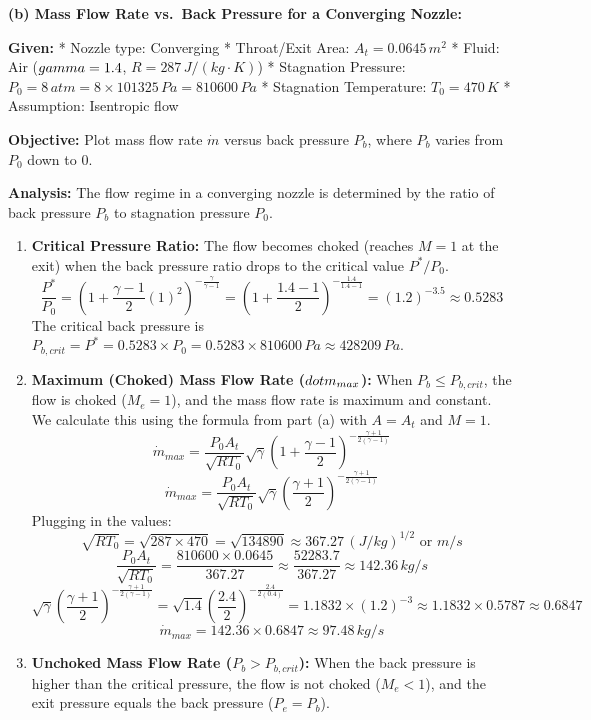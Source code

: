 \textbf{(b) Mass Flow Rate vs.~Back Pressure for a Converging Nozzle:}

\textbf{Given:} * Nozzle type: Converging * Throat/Exit Area:
\(A_t = 0.0645 \, m^2\) * Fluid: Air (\(\\gamma = 1.4\),
\(R = 287 \, J/(kg \cdot K)\)) * Stagnation Pressure:
\(P_0 = 8 \, atm = 8 \times 101325 \, Pa = 810600 \, Pa\) * Stagnation
Temperature: \(T_0 = 470 \, K\) * Assumption: Isentropic flow

\textbf{Objective:} Plot mass flow rate \(\dot{m}\) versus back pressure
\(P_b\), where \(P_b\) varies from \(P_0\) down to 0.

\textbf{Analysis:} The flow regime in a converging nozzle is determined
by the ratio of back pressure \(P_b\) to stagnation pressure \(P_0\).

\begin{enumerate}
\def\labelenumi{\arabic{enumi}.}
\item
  \textbf{Critical Pressure Ratio:} The flow becomes choked (reaches
  \(M=1\) at the exit) when the back pressure ratio drops to the
  critical value \(P^*/P_0\).
  \[ \frac{P^*}{P_0} = \left( 1 + \frac{\gamma-1}{2} (1)^2 \right)^{-\frac{\gamma}{\gamma-1}} = \left( 1 + \frac{1.4-1}{2} \right)^{-\frac{1.4}{1.4-1}} = (1.2)^{-3.5} \approx 0.5283 \]
  The critical back pressure is
  \(P_{b, crit} = P^* = 0.5283 \times P_0 = 0.5283 \times 810600 \, Pa \approx 428209 \, Pa\).
\item
  \textbf{Maximum (Choked) Mass Flow Rate (\(\\dot{m}_{max}\)):} When
  \(P_b \le P_{b, crit}\), the flow is choked (\(M_e = 1\)), and the
  mass flow rate is maximum and constant. We calculate this using the
  formula from part (a) with \(A=A_t\) and \(M=1\).
  \[ \dot{m}_{max} = \frac{P_0 A_t}{\sqrt{R T_0}} \sqrt{\gamma} \left( 1 + \frac{\gamma-1}{2} \right)^{-\frac{\gamma+1}{2(\gamma-1)}} \]
  \[ \dot{m}_{max} = \frac{P_0 A_t}{\sqrt{R T_0}} \sqrt{\gamma} \left( \frac{\gamma+1}{2} \right)^{-\frac{\gamma+1}{2(\gamma-1)}} \]
  Plugging in the values:
  \[ \sqrt{R T_0} = \sqrt{287 \times 470} = \sqrt{134890} \approx 367.27 \, (J/kg)^{1/2} \text{ or } m/s \]
  \[ \frac{P_0 A_t}{\sqrt{R T_0}} = \frac{810600 \times 0.0645}{367.27} \approx \frac{52283.7}{367.27} \approx 142.36 \, kg/s \]
  \[ \sqrt{\gamma} \left( \frac{\gamma+1}{2} \right)^{-\frac{\gamma+1}{2(\gamma-1)}} = \sqrt{1.4} \left( \frac{2.4}{2} \right)^{-\frac{2.4}{2(0.4)}} = 1.1832 \times (1.2)^{-3} \approx 1.1832 \times 0.5787 \approx 0.6847 \]
  \[ \dot{m}_{max} = 142.36 \times 0.6847 \approx 97.48 \, kg/s \]
\item
  \textbf{Unchoked Mass Flow Rate (\(P_b > P_{b, crit}\)):} When the
  back pressure is higher than the critical pressure, the flow is not
  choked (\(M_e < 1\)), and the exit pressure equals the back pressure
  (\(P_e = P_b\)).


\end{enumerate}
